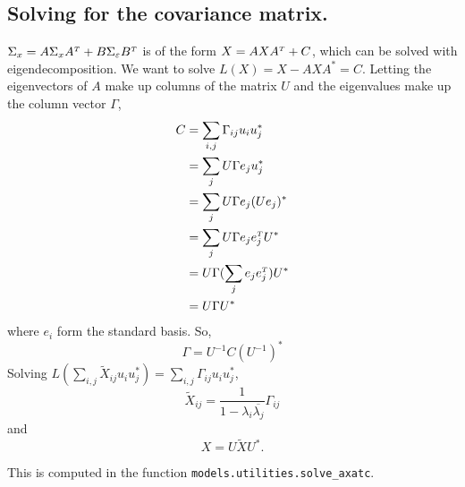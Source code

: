 \documentclass{article}
\begin{document}
\subsection{Solving for the covariance matrix.}
$\Sigma_x = A \Sigma_x A\trans + B \Sigma_\varepsilon B\trans$ is of the form $X = AXA\trans + C$, which can be solved with eigendecomposition. We want to solve $L(X) = X - AXA^* = C$. Letting the eigenvectors of $A$ make up columns of the matrix $U$ and the eigenvalues make up the column vector $\Gamma$,
\begin{align}
    C     &= \sum_{i,j} \Gamma_{ij} u_i u_j^*\\
          &= \sum_j U \Gamma e_j u_j^*\\
          &= \sum_j U \Gamma e_j(U e_j)^*\\
          &= \sum_j U \Gamma e_j e_j\trans U^*\\
          &= U \Gamma (\sum_j e_j e_j\trans) U^*\\
          &= U \Gamma U^*
\end{align}
where $e_i$ form the standard basis.  So,
\begin{equation}
    \Gamma = U^{-1}C(U^{-1})^*
\end{equation}
Solving $L(\sum_{i,j}\tilde{X}_{ij}u_iu_j^*) = \sum_{i,j} \Gamma_{ij} u_i u_j^*$,
\begin{equation}
    \tilde{X}_{ij} = \frac{1}{1-\lambda_i\overline{\lambda_j}} \Gamma_{ij}
\end{equation}
and
\begin{equation}
    X = U \tilde{X} U^*.
\end{equation}

This is computed in the function \texttt{models.utilities.solve\_axatc}.
\end{document}
